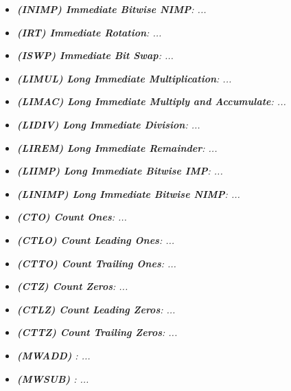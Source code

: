 \begin{multicols}{2}
\begin{itemize}
                \item \textit{\textbf{(INIMP) Immediate Bitwise NIMP}: ...}
                
                \item \textit{\textbf{(IRT) Immediate Rotation}: ...}

                \item \textit{\textbf{(ISWP) Immediate Bit Swap}: ...}

                \item \textit{\textbf{(LIMUL) Long Immediate Multiplication}: ...}

                \item \textit{\textbf{(LIMAC) Long Immediate Multiply and Accumulate}: ...}
                
                \item \textit{\textbf{(LIDIV) Long Immediate Division}: ...}

                \item \textit{\textbf{(LIREM) Long Immediate Remainder}: ...}

                \item \textit{\textbf{(LIIMP) Long Immediate Bitwise IMP}: ...}

                \item \textit{\textbf{(LINIMP) Long Immediate Bitwise NIMP}: ...}
                
                \item \textit{\textbf{(CTO) Count Ones}: ...}

                \item \textit{\textbf{(CTLO) Count Leading Ones}: ...}

                \item \textit{\textbf{(CTTO) Count Trailing Ones}: ...}

                \item \textit{\textbf{(CTZ) Count Zeros}: ...}
                
                \item \textit{\textbf{(CTLZ) Count Leading Zeros}: ...}

                \item \textit{\textbf{(CTTZ) Count Trailing Zeros}: ...}

                \item \textit{\textbf{(MWADD) }: ...}

                \item \textit{\textbf{(MWSUB) }: ...}
                

\end{itemize}
\end{multicols}
